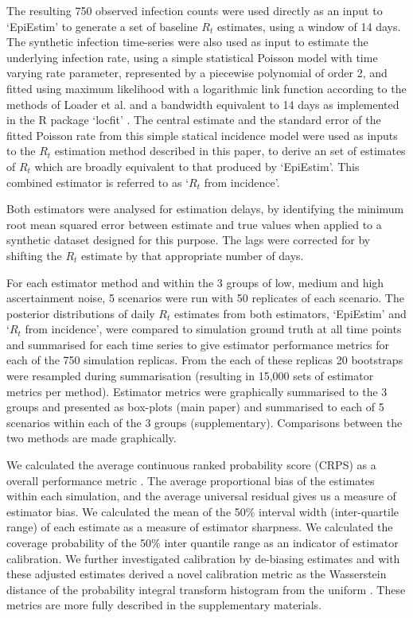 \documentclass[10pt,letterpaper]{article}
\begin{document}
The resulting 750 observed infection counts were used directly as an input to `EpiEstim' to generate a set of baseline $R_t$ estimates, using a window of 14 days. The synthetic infection time-series were also used as input to estimate the underlying infection rate, using a simple statistical Poisson model with time varying rate parameter, represented by a piecewise polynomial of order 2, and fitted using maximum likelihood with a logarithmic link function according to the methods of Loader et al. \cite{loader1999} and a bandwidth equivalent to 14 days as implemented in the R package `locfit' \cite{loader2020}. The central estimate and the standard error of the fitted Poisson rate from this simple statical incidence model were used as inputs to the $R_t$ estimation method described in this paper, to derive an set of estimates of $R_t$ which are broadly equivalent to that produced by `EpiEstim'. This combined estimator is referred to as `$R_t$ from incidence'.

Both estimators were analysed for estimation delays, by identifying the minimum root mean squared error between estimate and true values when applied to a synthetic dataset designed for this purpose. The lags were corrected for by shifting the $R_t$ estimate by that appropriate number of days.

For each estimator method and within the 3 groups of low, medium and high ascertainment noise, 5 scenarios were run with 50 replicates of each scenario. The posterior distributions of daily $R_t$ estimates from both estimators, `EpiEstim' and `$R_t$ from incidence', were compared to simulation ground truth at all time points and summarised for each time series to give estimator performance metrics for each of the 750 simulation replicas. From the each of these replicas 20 bootstraps were resampled during summarisation (resulting in 15,000 sets of estimator metrics per method). Estimator metrics were graphically summarised to the 3 groups and presented as box-plots (main paper) and summarised to each of 5 scenarios within each of the 3 groups (supplementary). Comparisons between the two methods are made graphically.

We calculated the average continuous ranked probability score (CRPS) as a overall performance metric \cite{anderson1996,bosse2024,bosse2023,brocker2008,gneiting2007}. The average proportional bias of the estimates within each simulation, and the average universal residual gives us a measure of estimator bias. We calculated the mean of the 50\% interval width (inter-quartile range) of each estimate as a measure of estimator sharpness. We calculated the coverage probability of the 50\% inter quantile range as an indicator of estimator calibration. We further investigated calibration by de-biasing estimates and with these adjusted estimates derived a novel calibration metric as the Wasserstein distance \cite{panaretos2019} of the probability integral transform histogram from the uniform \cite{david1948,hamill2001,wilks2019,brockwell2007}. These metrics are more fully described in the supplementary materials.
\end{document}
